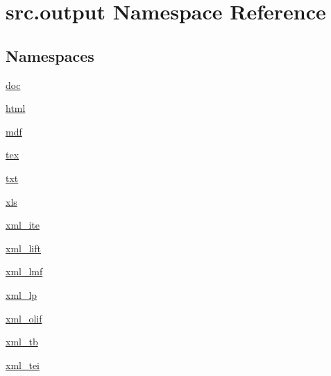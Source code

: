 \hypertarget{namespacesrc_1_1output}{\section{src.\+output Namespace Reference}
\label{namespacesrc_1_1output}
}
\subsection*{Namespaces}
\begin{DoxyCompactItemize}
\item 
 \hyperlink{namespacesrc_1_1output_1_1doc}{doc}
\item 
 \hyperlink{namespacesrc_1_1output_1_1html}{html}
\item 
 \hyperlink{namespacesrc_1_1output_1_1mdf}{mdf}
\item 
 \hyperlink{namespacesrc_1_1output_1_1tex}{tex}
\item 
 \hyperlink{namespacesrc_1_1output_1_1txt}{txt}
\item 
 \hyperlink{namespacesrc_1_1output_1_1xls}{xls}
\item 
 \hyperlink{namespacesrc_1_1output_1_1xml__ite}{xml\+\_\+ite}
\item 
 \hyperlink{namespacesrc_1_1output_1_1xml__lift}{xml\+\_\+lift}
\item 
 \hyperlink{namespacesrc_1_1output_1_1xml__lmf}{xml\+\_\+lmf}
\item 
 \hyperlink{namespacesrc_1_1output_1_1xml__lp}{xml\+\_\+lp}
\item 
 \hyperlink{namespacesrc_1_1output_1_1xml__olif}{xml\+\_\+olif}
\item 
 \hyperlink{namespacesrc_1_1output_1_1xml__tb}{xml\+\_\+tb}
\item 
 \hyperlink{namespacesrc_1_1output_1_1xml__tei}{xml\+\_\+tei}
\end{DoxyCompactItemize}
